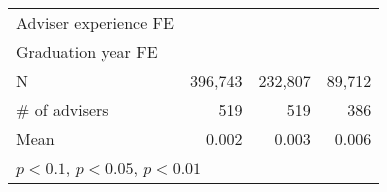 {\begin{tabular}{l*{3}{D{.}{.}{-1}}}
\addlinespace
Adviser experience FE         	&     \checkmark         	&     \checkmark         	&     \checkmark         \\
\addlinespace
Graduation year FE            	&     \checkmark         	&     \checkmark         	&     \checkmark         \\
\midrule
N                             	&        396,743         	&        232,807         	&         89,712         \\
\# of advisers                	&            519         	&            519         	&            386         \\
Mean                          	&          0.002         	&          0.003         	&          0.006         \\
\bottomrule
{}\\
\end{tabular}
}
